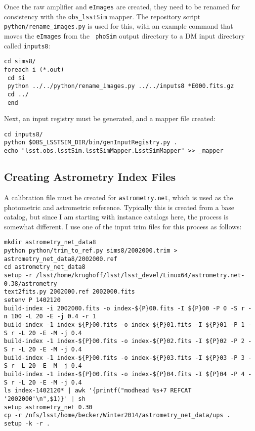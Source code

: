 \documentclass[prd, nofootinbib, floatfix, 11pt, tightenlines, times]{article}
\begin{document}
\begin{appendices}
Once the raw amplifier and {\tt eImages} are created, they need to be
renamed for consistency with the {\tt obs\_lsstSim} mapper.  The
repository script {\tt python/rename\_images.py} is used for this,
with an example command that moves the {\tt eImages} from the {\tt
  phoSim} output directory to a DM input directory called {\tt inputs8}:
{\small
\begin{Verbatim}[frame=single]
cd sims8/
foreach i (*.out)
 cd $i
 python ../../python/rename_images.py ../../inputs8 *E000.fits.gz
 cd ../ 
 end
\end{Verbatim}
}

Next, an input registry must be generated, and a mapper file created:

{\small
\begin{Verbatim}[frame=single]
cd inputs8/
python $OBS_LSSTSIM_DIR/bin/genInputRegistry.py .
echo "lsst.obs.lsstSim.lsstSimMapper.LsstSimMapper" >> _mapper
\end{Verbatim}
}

\subsection{Creating Astrometry Index Files}

A calibration file must be created for {\tt astrometry.net}, which is
used as the photometric and astrometric reference.  Typically this is
created from a base catalog, but since I am starting with instance
catalogs here, the process is somewhat different.  I use one of the
input trim files for this process as follows: 

{\footnotesize
\begin{Verbatim}[frame=single]
mkdir astrometry_net_data8
python python/trim_to_ref.py sims8/2002000.trim > astrometry_net_data8/2002000.ref
cd astrometry_net_data8
setup -r /lsst/home/krughoff/lsst/lsst_devel/Linux64/astrometry.net-0.38/astrometry
text2fits.py 2002000.ref 2002000.fits
setenv P 1402120
build-index -i 2002000.fits -o index-${P}00.fits -I ${P}00 -P 0 -S r -n 100 -L 20 -E -j 0.4 -r 1
build-index -1 index-${P}00.fits -o index-${P}01.fits -I ${P}01 -P 1 -S r -L 20 -E -M -j 0.4 
build-index -1 index-${P}00.fits -o index-${P}02.fits -I ${P}02 -P 2 -S r -L 20 -E -M -j 0.4 
build-index -1 index-${P}00.fits -o index-${P}03.fits -I ${P}03 -P 3 -S r -L 20 -E -M -j 0.4 
build-index -1 index-${P}00.fits -o index-${P}04.fits -I ${P}04 -P 4 -S r -L 20 -E -M -j 0.4 
ls index-1402120* | awk '{printf("modhead %s+7 REFCAT '2002000'\n",$1)}' | sh     
setup astrometry_net 0.30  
cp -r /nfs/lsst/home/becker/Winter2014/astrometry_net_data/ups .
setup -k -r .
\end{Verbatim}
}


\end{appendices}
\end{document}
